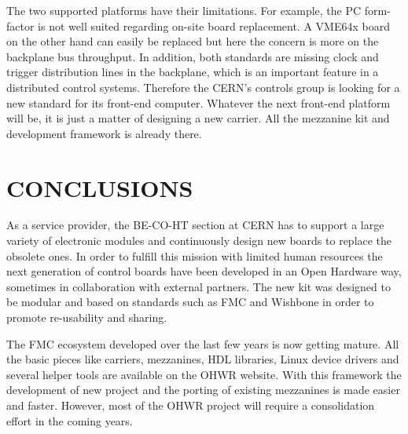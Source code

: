 \documentclass{JAC2003}
\begin{document}
The two supported platforms have their limitations.
For example, the PC form-factor is not well suited regarding on-site board replacement.
A VME64x board on the other hand can easily be replaced but here the concern is more on the backplane bus throughput.
In addition, both standards are missing clock and trigger distribution lines in the backplane, which is an important feature in a distributed control systems.
Therefore the CERN's controls group is looking for a new standard for its front-end computer.
Whatever the next front-end platform will be, it is just a matter of designing a new carrier. All the mezzanine kit and development framework is already there.

\section{CONCLUSIONS}

As a service provider, the BE-CO-HT section at CERN has to support a large variety of electronic modules and continuously design new boards to replace the obsolete ones.
In order to fulfill this mission with limited human resources the next generation of control boards have been developed in an Open Hardware way, sometimes in collaboration with external partners.
The new kit was designed to be modular and based on standards such as FMC and Wishbone in order to promote re-usability and sharing.

The FMC ecosystem developed over the last few years is now getting mature.
All the basic pieces like carriers, mezzanines, HDL libraries, Linux device drivers and several helper tools are available on the OHWR website.
With this framework the development of new project and the porting of existing mezzanines is made easier and faster.
However, most of the OHWR project will require a consolidation effort in the coming years.


\end{document}
